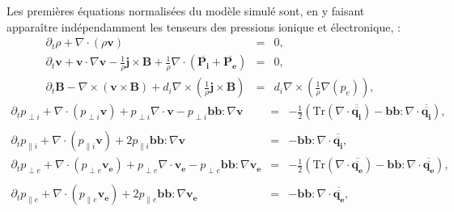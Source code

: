 Les premières équations normalisées du modèle simulé sont, en y faisant apparaître indépendamment les tenseurs des pressions ionique et électronique, : 
\begin{eqnarray}
\label{eq:mlf_r} \partial_t \rho + \nabla \cdot \left(\rho \boldsymbol{v}\right) &=& 0,\\
\label{eq:mlf_v} \partial_t  \boldsymbol{v} + \boldsymbol{v} \cdot \nabla  \boldsymbol{v} - \frac{1}{\rho} \boldsymbol{j} \times \boldsymbol{B} + \frac{1}{\rho} \nabla \cdot \left(\overline{\boldsymbol{P_i}} + \overline{\boldsymbol{P_e}} \right)  &=& 0,  \\
\label{eq:mlf_b} \partial_t \boldsymbol{B} - \nabla \times \left( \boldsymbol{v} \times \boldsymbol{B} \right) +  d_i  \nabla \times \left( \frac{1}{\rho} \boldsymbol{j}\times \boldsymbol{B} \right) &=& d_i \nabla \times \left( \frac{1}{\rho} \nabla \left(  p_e\right) \right),
\end{eqnarray}
\begin{eqnarray}
\label{eq:mlf_pperpi} \partial_t  p_{\perp i }  +  \nabla \cdot \left(p_{\perp i } \boldsymbol{v} \right) +  p_{\perp i }\nabla \cdot\boldsymbol{v} -  p_{\perp i } \boldsymbol{b}\boldsymbol{b} : \nabla \boldsymbol{v}  &=& - \frac{1}{2} \left( \text{Tr}(\nabla \cdot \overline{\overline{\boldsymbol{q_i}}}) - \boldsymbol{b}\boldsymbol{b} : \nabla \cdot \overline{\overline{\boldsymbol{q_i}}} \right), \nonumber \\ && \\
\label{eq:mlf_ppari} \partial_t  p_{\parallel i }  +  \nabla \cdot \left(p_{\parallel i } \boldsymbol{v} \right) +  2 p_{\parallel i }  \boldsymbol{b}\boldsymbol{b} : \nabla \boldsymbol{v}  &=&  - \boldsymbol{b}\boldsymbol{b} : \nabla \cdot \overline{\overline{\boldsymbol{q_i}}},   \\
\label{eq:mlf_pperpe} \partial_t  p_{\perp e }  +  \nabla \cdot \left(p_{\perp e } \boldsymbol{v_e} \right) +  p_{\perp e }\nabla \cdot\boldsymbol{v_e} -  p_{\perp e } \boldsymbol{b}\boldsymbol{b} : \nabla \boldsymbol{v_e}  &=&  - \frac{1}{2} \left( \text{Tr}(\nabla \cdot \overline{\overline{\boldsymbol{q_e}}}) - \boldsymbol{b}\boldsymbol{b} : \nabla \cdot \overline{\overline{\boldsymbol{q_e}}} \right), \nonumber \\ && \\
\label{eq:mlf_ppare} \partial_t  p_{\parallel e }  +  \nabla \cdot \left(p_{\parallel e } \boldsymbol{v_e} \right) +  2 p_{\parallel e }  \boldsymbol{b}\boldsymbol{b} : \nabla \boldsymbol{v_e}  &=& - \boldsymbol{b}\boldsymbol{b} : \nabla \cdot \overline{\overline{\boldsymbol{q_e}}}, 
\end{eqnarray}
